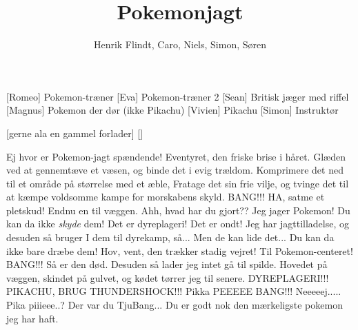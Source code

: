 \documentclass[a4paper,11pt]{article}
\title{Pokemonjagt}
\author{Henrik Flindt, Caro, Niels, Simon, Søren}
\begin{document}
\maketitle

\begin{roles}
[Romeo] Pokemon-træner
[Eva] Pokemon-træner 2
[Sean] Britisk jæger med riffel
[Magnus] Pokemon der dør (ikke Pikachu)
[Vivien] Pikachu
[Simon] Instruktør
\end{roles}

\begin{props}
[gerne ala en gammel forlader]
[]
\end{props}


\begin{sketch}
 Ej hvor er Pokemon-jagt spændende! Eventyret, den friske brise i håret.
  Glæden ved at gennemtæve et væsen, og binde det i evig trældom. Komprimere det ned til et område på størrelse med et æble,
  Fratage det sin frie vilje, og tvinge det til at kæmpe voldsomme kampe for morskabens skyld.
 BANG!!!
 HA, satme et pletskud! Endnu en til væggen.
 Ahh, hvad har du gjort??
 Jeg jager Pokemon!
 Du kan da ikke \emph{skyde} dem! Det er dyreplageri! Det er ondt!
 Jeg har jagttilladelse, og desuden så bruger I dem til dyrekamp, så...
 Men de kan lide det... Du kan da ikke bare dræbe dem! Hov, vent, den trækker stadig vejret! Til Pokemon-centeret!
 BANG!!!
 Så er den død. Desuden så lader jeg intet gå til spilde. Hovedet på væggen, skindet på gulvet, og kødet tørrer jeg til senere.
 DYREPLAGERI!!! PIKACHU, BRUG THUNDERSHOCK!!!
 Pikka PEEEEE
 BANG!!!
 Neeeeej.....
 Pika piiieee..? 
 Der var du TjuBang...  Du er godt nok den mærkeligste pokemon jeg har haft.
\end{sketch}
\end{document}
